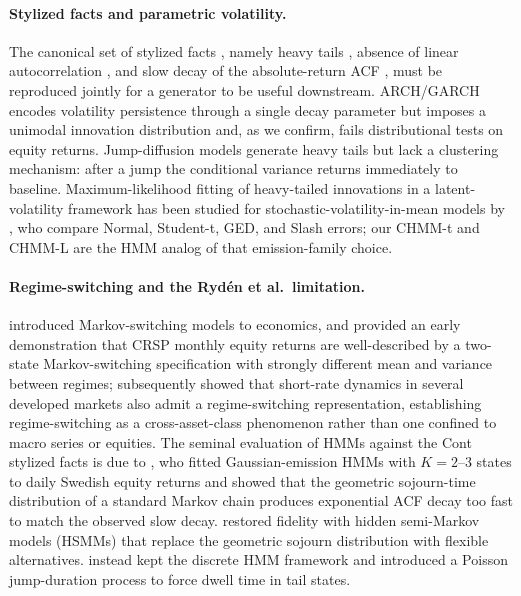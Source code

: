 \paragraph{Stylized facts and parametric volatility.}
The canonical set of stylized facts \cite{cont2001empirical}, namely heavy tails \cite{mandelbrot1963variation}, absence of linear autocorrelation \cite{fama1970efficient}, and slow decay of the absolute-return ACF \cite{schwert1989does}, must be reproduced jointly for a generator to be useful downstream.
ARCH/GARCH \cite{engle1982autoregressive, bollerslev1986generalized} encodes volatility persistence through a single decay parameter but imposes a unimodal innovation distribution and, as we confirm, fails distributional tests on equity returns.
Jump-diffusion models \cite{merton1976option, kou2002jump} generate heavy tails but lack a clustering mechanism: after a jump the conditional variance returns immediately to baseline.
Maximum-likelihood fitting of heavy-tailed innovations in a latent-volatility framework has been studied for stochastic-volatility-in-mean models by \citet{abantovalle2017svm}, who compare Normal, Student-t, GED, and Slash errors; our CHMM-t and CHMM-L are the HMM analog of that emission-family choice.

\paragraph{Regime-switching and the Ryd\'{e}n et al.\ limitation.}
\citet{hamilton1989new} introduced Markov-switching models to economics, and \citet{schaller1997regime} provided an early demonstration that CRSP monthly equity returns are well-described by a two-state Markov-switching specification with strongly different mean and variance between regimes; \citet{angbekaert2002regime} subsequently showed that short-rate dynamics in several developed markets also admit a regime-switching representation, establishing regime-switching as a cross-asset-class phenomenon rather than one confined to macro series or equities.
The seminal evaluation of HMMs against the Cont stylized facts is due to \citet{ryden1998stylized}, who fitted Gaussian-emission HMMs with $K = 2$--$3$ states to daily Swedish equity returns and showed that the geometric sojourn-time distribution of a standard Markov chain produces exponential ACF decay too fast to match the observed slow decay.
\citet{bulla2006stylized} restored fidelity with hidden semi-Markov models (HSMMs) that replace the geometric sojourn distribution with flexible alternatives.
\citet{alswaidan2026hybrid} instead kept the discrete HMM framework and introduced a Poisson jump-duration process to force dwell time in tail states.

